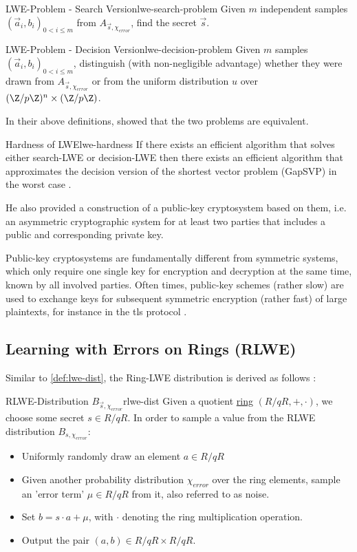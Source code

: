 \begin{definition}{LWE-Problem - Search Version}{lwe-search-problem}
  Given $m$ independent samples $(\vec{a}_i, b_i)_{0 < i \leq m}$ from $A_{\vec{s}, \chi_{error}}$, find the secret $\vec{s}$.
\end{definition}
\begin{definition}{LWE-Problem - Decision Version}{lwe-decision-problem}
  Given $m$ samples $(\vec{a}_i, b_i)_{0 < i \leq m}$, distinguish (with non-negligible advantage) whether they were drawn from $A_{\vec{s}, \chi_{error}}$ or from the uniform distribution $u$ over $(\Z / p \Z)^n \times (\Z / p \Z)$.
\end{definition}

In their above definitions, \citeauthor{2005-lwe-original} showed that the two problems are equivalent.

\begin{theorem}{Hardness of LWE}{lwe-hardness}
  If there exists an efficient algorithm that solves either search-LWE or decision-LWE then there exists an efficient algorithm that approximates the decision version of the shortest vector problem (GapSVP) in the worst case \parencite{2010-lwe-survey}.
\end{theorem}

He also provided a construction of a public-key cryptosystem based on them, i.e. an asymmetric cryptographic system for at least two parties that includes a public and corresponding private key.

Public-key cryptosystems are fundamentally different from symmetric systems, which only require one single key for encryption and decryption at the same time, known by all involved parties.
Often times, public-key schemes (rather slow) are used to exchange keys for subsequent symmetric encryption (rather fast) of large plaintexts, for instance in the \gls{tls} protocol \parencite{rfc8446}.

\subsection{Learning with Errors on Rings (RLWE)}
Similar to \cref{def:lwe-dist}, the Ring-LWE distribution is derived as follows \parencite{2010-rlwe-original}:

\begin{corollary}{RLWE-Distribution $B_{\vec{s}, \chi_{error}}$}{rlwe-dist}
  Given a quotient \hyperref[def:ring]{ring} $(R/qR, +, \cdot)$, we choose some secret $s \in R/qR$.
  In order to sample a value from the RLWE distribution $B_{s, \chi_{error}}$:
  \begin{itemize}
    \item Uniformly randomly draw an element $a \in R/qR$
    \item Given another probability distribution $\chi_{error}$ over the ring elements, sample an 'error term' $\mu \in R/qR$ from it, also referred to as noise.
    \item Set $b = s \cdot a + \mu$, with $\cdot$ denoting the ring multiplication operation.
    \item Output the pair $(a, b) \in R/qR \times R/qR$.
  \end{itemize}
\end{corollary}

